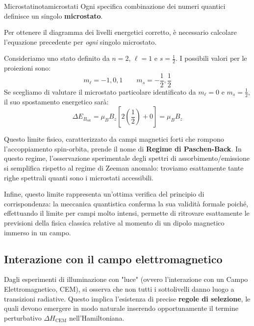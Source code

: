 \begin{note}{Microstati}{notamicrostati}
    Ogni specifica combinazione dei numeri quantici definisce un singolo \textbf{microstato}.
\end{note}

 Per ottenere il diagramma dei livelli energetici corretto, è necessario calcolare l'equazione precedente per \textit{ogni} singolo microstato.

\begin{example}
Consideriamo uno stato definito da \( n=2 \), \( \ell=1 \) e \( s=\frac{1}{2} \). I possibili valori per le proiezioni sono:
\begin{equation*}
    m_\ell = -1, 0, 1 \qquad
    m_s = -\frac{1}{2}, \frac{1}{2}
\end{equation*}
Se scegliamo di valutare il microstato particolare identificato da \( m_\ell = 0 \) e \( m_s = \frac{1}{2} \), il suo spostamento energetico sarà:
\begin{equation*}
    \Delta E_{B_{\text{est}}} = \mu_B B_z \left[ 2 \left(\frac{1}{2}\right) + 0 \right] = \mu_B B_z
\end{equation*} 
\end{example}

Questo limite fisico, caratterizzato da campi magnetici forti che rompono l'accoppiamento spin-orbita, prende il nome di \textbf{Regime di Paschen-Back}.
In questo regime, l'osservazione sperimentale degli spettri di assorbimento/emissione si semplifica rispetto al regime di Zeeman anomalo: troviamo esattamente tante righe spettrali quanti sono i microstati accessibili.

Infine, questo limite rappresenta un'ottima verifica del principio di corrispondenza: la meccanica quantistica conferma la sua validità formale poiché, effettuando il limite per campi molto intensi, permette di ritrovare esattamente le previsioni della fisica classica relative al momento di un dipolo magnetico immerso in un campo.
\subsection{Interazione con il campo elettromagnetico}

Dagli esperimenti di illuminazione con "luce" (ovvero l'interazione con un Campo Elettromagnetico, CEM), si osserva che non tutti i sottolivelli danno luogo a transizioni radiative. Questo implica l'esistenza di precise \textbf{regole di selezione}, le quali devono emergere in modo naturale inserendo opportunamente il termine perturbativo \( \Delta H_{\text{CEM}} \) nell'Hamiltoniana.

